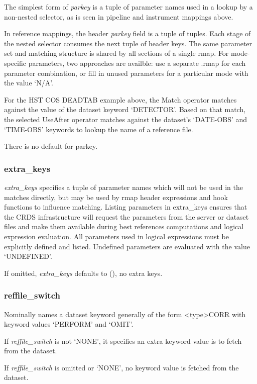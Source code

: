 \documentclass[letterpaper,10pt,english]{sphinxmanual}
\begin{document}
The simplest form of \emph{parkey} is a tuple of parameter names used in a lookup by a non-nested selector,  as is
seen in pipeline and instrument mappings above.

In reference mappings,  the header \emph{parkey} field is a tuple of tuples.  Each stage of the nested selector
consumes the next tuple of header keys.  The same parameter set and matching structure is shared by all sections
of a single rmap.   For mode-specific parameters,  two approaches are availble:  use a separate .rmap for each
parameter combination, or fill in unused parameters for a particular mode with the value `N/A'.

For the HST COS DEADTAB example above,   the Match operator matches against the value of the dataset keyword
`DETECTOR'.   Based on that match, the selected UseAfter operator matches against the dataset's `DATE-OBS' and
`TIME-OBS' keywords to lookup the name of a reference file.

There is no default for parkey.


\subsubsection{extra\_keys}
\label{rmap_syntax:extra-keys}
\emph{extra\_keys} specifies a tuple of parameter names which will not be used in the matches directly,  but may be used by
rmap header expressions and hook functions to influence matching.  Listing parameters in extra\_keys ensures that the
CRDS infrastructure will request the parameters from the server or dataset files and make them available during best
references computations and logical expression evaluation.   All parameters used in logical expressions must be
explicitly defined and listed.   Undefined parameters are evaluated with the value `UNDEFINED'.

If omitted, \emph{extra\_keys} defaults to (),  no extra keys.


\subsubsection{reffile\_switch}
\label{rmap_syntax:reffile-switch}
Nominally names a dataset keyword generally of the form \textless{}type\textgreater{}CORR with keyword values `PERFORM' and `OMIT'.

If \emph{reffile\_switch} is not `NONE',  it specifies an extra keyword value is to fetch from the dataset.

If \emph{reffile\_switch} is omitted or `NONE',  no keyword value is fetched from the dataset.
\end{document}
